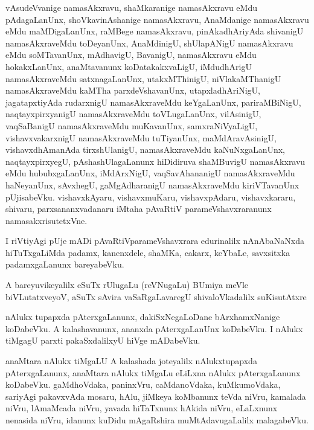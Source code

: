 \documentclass{article}
\begin{document}
\begin{mn}
vAsudeVvanige  namasAkxravu,  shaMkaranige  namasAkxravu  eMdu  pAdagaLanUnx,  shoVkavinAshanige  
namasAkxravu,  AnaMdanige  namasAkxravu  eMdu  maMDigaLanUnx,  raMBege  namasAkxravu,  pinAkadhAriyAda  
shivanigU  namasAkxraveMdu  toDeyanUnx,  AnaMdinigU,  shUlapANigU  namasAkxravu  eMdu  soMTavanUnx,  
mAdhavigU,  BavanigU,  namasAkxravu  eMdu  hokakxLanUnx,  anaMtavanunx  koDatakakxvaLigU,  iMdudhArigU  
namasAkxraveMdu  satxnagaLanUnx,  utakxMThinigU,  niVlakaMThanigU  namasAkxraveMdu  kaMTha parxdeVshavanUnx,  
utapxladhAriNigU,  jagatapxtiyAda  rudarxnigU  namasAkxraveMdu  keYgaLanUnx,  pariraMBiNigU,  naqtayxpirxyanigU  
namasAkxraveMdu  toVLugaLanUnx,  vilAsinigU,  vaqSaBanigU  namasAkxraveMdu  muKavanUnx,  samxraNiVyaLigU,  
vishavxvakarxnigU  namasAkxraveMdu  tuTiyanUnx,  maMdAravAsinigU,  vishavxdhAmanAda  tirxshUlanigU,  
namasAkxraveMdu  kaNuNxgaLanUnx,  naqtayxpirxyegU,  pAshashUlagaLanunx  hiDidiruva  shaMBuvigU  namasAkxravu  
eMdu  hububxgaLanUnx,  iMdArxNigU,  vaqSavAhananigU  namasAkxraveMdu  haNeyanUnx,  sAvxhegU,  gaMgAdharanigU  
namasAkxraveMdu  kiriVTavanUnx  pUjisabeVku.  vishavxkAyaru,  vishavxmuKaru,  vishavxpAdaru,  vishavxkararu,  
shivaru,  parxsananxvadanaru  iMtaha  pAvaRtiV  parameVshavxraranunx  namasakxrisutetxVne.
\end{mn}

\begin{mn}
I  riVtiyAgi  pUje  mADi  pAvaRtiVparameVshavxrara edurinalilx  nAnAbaNaNxda  hiTuTxgaLiMda  padamx,  
kanenxdele,  shaMKa,  cakarx,  keYbaLe,  savxsitxka padamxgaLanunx  bareyabeVku.
\end{mn}

\begin{mn}
A  bareyuvikeyalilx  eSuTx  rUlugaLu (reVNugaLu)  BUmiya  meVle  biVLutatxveyoV,  aSuTx  sAvira  
vaSaRgaLavaregU  shivaloVkadalilx  suKisutAtxre
\end{mn}

\begin{mn}
nAlukx  tupapxda  pAterxgaLanunx,  dakiSxNegaLoDane  bArxhamxNanige  koDabeVku.  A  kalashavanunx,  
ananxda  pAterxgaLanUnx  koDabeVku.  I  nAlukx  tiMgagU  parxti  pakaSxdalilxyU  hiVge  mADabeVku.
\end{mn}

\begin{mn}
anaMtara  nAlukx  tiMgaLU  A  kalashada  joteyalilx  nAlukxtupapxda  pAterxgaLanunx,  anaMtara  
nAlukx  tiMgaLu  eLiLxna  nAlukx  pAterxgaLanunx  koDabeVku.  gaMdhoVdaka,  paninxVru,  
caMdanoVdaka,  kuMkumoVdaka,  sariyAgi  pakavxvAda  mosaru,  hAlu,  jiMkeya  koMbanunx  
teVda  niVru,  kamalada  niVru,  lAmaMcada  niVru,  yavada  hiTaTxnunx  hAkida  niVru,  
eLaLxnunx  nenasida  niVru,  idanunx  kuDidu  mAgaRshira  muMtAdavugaLalilx  malagabeVku.
\end{mn}
\end{document}
